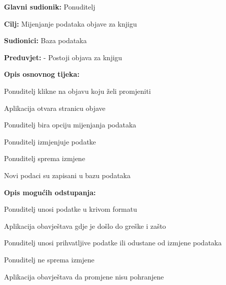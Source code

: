                     \noindent {}
					\begin{packed_item}
	
						\item \textbf{Glavni sudionik: } Ponuditelj
						\item  \textbf{Cilj:} Mijenjanje podataka objave za knjigu
						\item  \textbf{Sudionici:} Baza podataka
						\item  \textbf{Preduvjet:} - Postoji objava za knjigu
						\item  \textbf{Opis osnovnog tijeka:}
						
						\item[] \begin{packed_enum}
	
							\item Ponuditelj klikne na objavu koju želi promjeniti
                            \item Aplikacija otvara stranicu objave
							\item Ponuditelj bira opciju mijenjanja podataka
                            \item Ponuditelj izmjenjuje podatke
                            \item Ponuditelj sprema izmjene
                            \item Novi podaci su zapisani u bazu podataka
						\end{packed_enum}
						
						\item  \textbf{Opis mogućih odstupanja:}
						
						\item[] \begin{packed_item}
	
							\item[2.a] Ponuditelj unosi podatke u krivom formatu
							\item[] \begin{packed_enum}
								
								\item Aplikacija obavještava gdje je došlo do greške i zašto
								\item Ponuditelj unosi prihvatljive podatke ili odustane od izmjene podataka
								
							\end{packed_enum}

                            \item[2.b] Ponuditelj ne sprema izmjene
                            \item[] \begin{packed_enum}

                                \item Aplikacija obavještava da promjene nisu pohranjene
                            \end{packed_enum}
						\end{packed_item}
					\end{packed_item}

